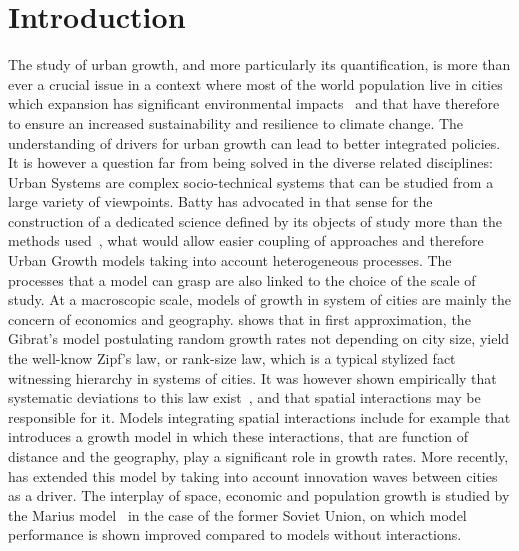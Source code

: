 \documentclass[10pt,letterpaper,draft]{article}
\begin{document}
\linenumbers

\justify


\section*{Introduction}


The study of urban growth, and more particularly its quantification, is more than ever a crucial issue in a context where most of the world population live in cities which expansion has significant environmental impacts~\cite{seto2012global} and that have therefore to ensure an increased sustainability and resilience to climate change. The understanding of drivers for urban growth can lead to better integrated policies. It is however a question far from being solved in the diverse related disciplines: Urban Systems are complex socio-technical systems that can be studied from a large variety of viewpoints. Batty has advocated in that sense for the construction of a dedicated science defined by its objects of study more than the methods used~\cite{batty2013new}, what would allow easier coupling of approaches and therefore Urban Growth models taking into account heterogeneous processes. The processes that a model can grasp are also linked to the choice of the scale of study. At a macroscopic scale, models of growth in system of cities are mainly the concern of economics and geography. \cite{gabaix1999zipf} shows that in first approximation, the Gibrat's model postulating random growth rates not depending on city size, yield the well-know Zipf's law, or rank-size law, which is a typical stylized fact witnessing hierarchy in systems of cities. It was however shown empirically that systematic deviations to this law exist~\cite{rozenfeld2008laws}, and that spatial interactions may be responsible for it. Models integrating spatial interactions include for example \cite{bretagnolle2000long} that introduces a growth model in which these interactions, that are function of distance and the geography, play a significant role in growth rates. More recently, \cite{favaro2011gibrat} has extended this model by taking into account innovation waves between cities as a driver. The interplay of space, economic and population growth is studied by the Marius model~\cite{cottineau2014evolution} in the case of the former Soviet Union, on which model performance is shown improved compared to models without interactions.
\end{document}
